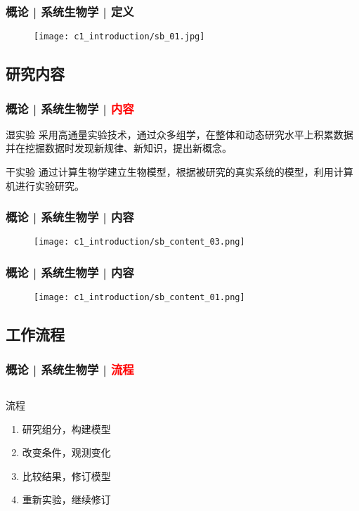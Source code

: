 \begin{frame}
  \frametitle{概论 | 系统生物学 | 定义}
  \begin{figure}
    \centering
    \texttt{[image: c1\_introduction/sb\_01.jpg]}
  \end{figure}
\end{frame}

\subsection{研究内容}
\begin{frame}
  \frametitle{概论 | 系统生物学 | \textcolor{red}{内容}}
  \begin{block}{湿实验}
采用高通量实验技术，通过众多组学，在整体和动态研究水平上积累数据并在挖掘数据时发现新规律、新知识，提出新概念。
  \end{block}
  \pause
  \begin{block}{干实验}
通过计算生物学建立生物模型，根据被研究的真实系统的模型，利用计算机进行实验研究。
  \end{block}
\end{frame}

\begin{frame}
  \frametitle{概论 | 系统生物学 | 内容}
  \begin{figure}
    \centering
    \texttt{[image: c1\_introduction/sb\_content\_03.png]}
  \end{figure}
\end{frame}

\begin{frame}
  \frametitle{概论 | 系统生物学 | 内容}
  \begin{figure}
    \centering
    \texttt{[image: c1\_introduction/sb\_content\_01.png]}
  \end{figure}
\end{frame}

\subsection{工作流程}
\begin{frame}
  \frametitle{概论 | 系统生物学 | \textcolor{red}{流程}}
  \begin{columns}
    \begin{block}{流程}
  \begin{enumerate}
    \item 研究组分，构建模型
    \item 改变条件，观测变化
    \item 比较结果，修订模型
    \item 重新实验，继续修订
  \end{enumerate}
    \end{block}
  \begin{figure}
    \centering
  \end{figure}
  \end{columns}
\end{frame}

